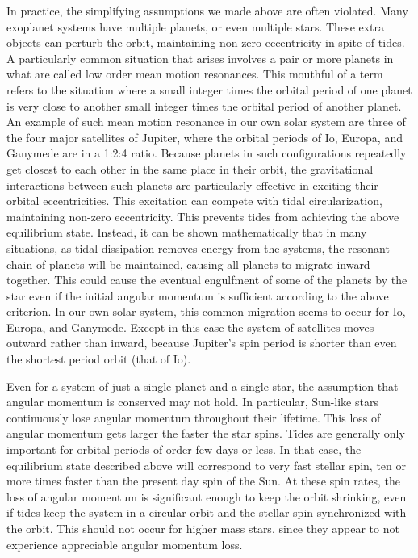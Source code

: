 In practice, the simplifying assumptions we made above are often violated. Many
exoplanet systems have multiple planets, or even multiple stars. These extra
objects can perturb the orbit, maintaining non-zero eccentricity in spite of
tides. A particularly common situation that arises involves a pair or more
planets in what are called low order mean motion resonances. This mouthful of a
term refers to the situation where a small integer times the orbital period of
one planet is very close to another small integer times the orbital period of
another planet. An example of such mean motion resonance in our own solar system
are three of the four major satellites of Jupiter, where the orbital periods of
Io, Europa, and Ganymede are in a 1:2:4 ratio. Because planets in such
configurations repeatedly get closest to each other in the same place in their
orbit, the gravitational interactions between such planets are particularly
effective in exciting their orbital eccentricities. This excitation can compete
with tidal circularization, maintaining non-zero eccentricity. This prevents
tides from achieving the above equilibrium state. Instead, it can be shown
mathematically that in many situations, as tidal dissipation removes energy from
the systems, the resonant chain of planets will be maintained, causing all
planets to migrate inward together. This could cause the eventual engulfment of
some of the planets by the star even if the initial angular momentum is
sufficient according to the above criterion. In our own solar system, this
common migration seems to occur for Io, Europa, and Ganymede. Except in this
case the system of satellites moves outward rather than inward, because
Jupiter's spin period is shorter than even the shortest period orbit (that of
Io).

Even for a system of just a single planet and a single star, the assumption that
angular momentum is conserved may not hold. In particular, Sun-like stars
continuously lose angular momentum throughout their lifetime. This loss of
angular momentum gets larger the faster the star spins. Tides are generally only
important for orbital periods of order few days or less. In that case, the
equilibrium state described above will correspond to very fast stellar spin, ten
or more times faster than the present day spin of the Sun. At these spin rates,
the loss of angular momentum is significant enough to keep the orbit shrinking,
even if tides keep the system in a circular orbit and the stellar spin
synchronized with the orbit. This should not occur for higher mass stars, since
they appear to not experience appreciable angular momentum loss.

